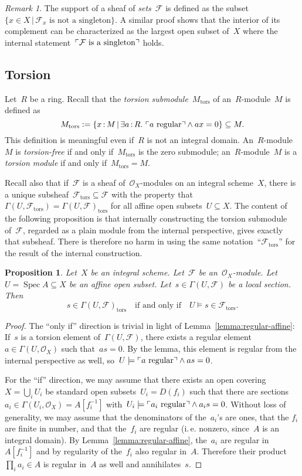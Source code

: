 \documentclass[10pt]{amsart}
\makeatletter
\theoremstyle{definition}
\theoremstyle{plain}
\newtheorem{prop}[defn]{Proposition}
\theoremstyle{remark}
\newtheorem{rem}[defn]{Remark}
\newcommand{\F}{\mathcal{F}}
\renewcommand{\O}{\mathcal{O}}
\newcommand{\tors}{\mathrm{tors}}
\DeclareMathOperator{\Spec}{Spec}
\newcommand{\?}{\,{:}\,}
\renewcommand{\_}{\mathpunct{.}\,}
\newcommand{\speak}[1]{\ulcorner\text{\textnormal{#1}}\urcorner}
\newcommand{\ie}{i.\,e.\@\xspace}
\newcommand{\defeq}{\vcentcolon=}
\makeatother
\begin{document}
\begin{rem}\label{rem:support-sheaf-of-sets}
The support of a sheaf of \emph{sets}~$\F$ is defined as the subset~$\{ x \in X \,|\,
\text{$\F_x$ is not a singleton} \}$. A similar proof shows that the interior
of its complement can be characterized as the largest open subset of~$X$ where
the internal statement~$\speak{$\F$ is a singleton}$ holds.\end{rem}


\subsection{Torsion} Let~$R$ be a ring. Recall that the
\emph{torsion submodule}~$M_\tors$ of an~$R$-module~$M$ is defined as
\[ M_\tors \defeq \{ x\?M \,|\, \exists a\?R\_ \speak{$a$ regular} \wedge ax = 0 \}
\subseteq M. \]
This definition is meaningful even if~$R$ is not an integral domain.
An~$R$-module~$M$ is \emph{torsion-free} if and only if~$M_\tors$ is
the zero submodule; an~$R$-module~$M$ is a \emph{torsion module} if and only
if~$M_\tors = M$.

Recall also that if~$\F$ is a sheaf of~$\O_X$-modules on an integral
scheme~$X$, there is a unique subsheaf~$\F_\tors \subseteq \F$ with the
property that~$\Gamma(U,\F_\tors) = \Gamma(U,\F)_\tors$ for all affine open
subsets~$U \subseteq X$. The content of the following proposition is that
internally constructing the torsion submodule of~$\F$, regarded as a plain
module from the internal perspective, gives exactly that subsheaf. There is
therefore no harm in using the same notation~``$\F_\tors$'' for the result of
the internal construction.

\begin{prop}Let~$X$ be an integral scheme. Let~$\F$ be an~$\O_X$-module. Let~$U
= \Spec A \subseteq X$ be an affine open subset. Let~$s \in \Gamma(U,\F)$ be a local
section. Then
\[ s \in \Gamma(U,\F)_\tors \quad\text{if and only if}\quad
  U \models s \in \F_\tors. \]
\end{prop}
\begin{proof}
The ``only if'' direction is trivial in light of
Lemma~\ref{lemma:regular-affine}: If~$s$ is a torsion element
of~$\Gamma(U,\F)$, there exists a regular element~$a \in \Gamma(U,\O_X)$ such
that~$as = 0$. By the lemma, this element is regular from the internal
perspective as well, so~$U \models \speak{$a$ regular} \wedge as = 0$.

For the ``if'' direction, we may assume that there exists an open covering~$X =
\bigcup_i U_i$ be standard open subsets~$U_i = D(f_i)$ such that there are
sections~$a_i \in \Gamma(U_i,\O_X) = A[f_i^{-1}]$ with~$U_i \models \speak{$a_i$ regular}
\wedge a_i s = 0$. Without loss of generality, we may assume that the
denominators of the~$a_i$'s are ones, that the $f_i$ are
finite in number, and that the~$f_i$ are regular (\ie nonzero, since~$A$ is an
integral domain). By Lemma~\ref{lemma:regular-affine}, the~$a_i$ are
regular in~$A[f_i^{-1}]$ and by regularity of the~$f_i$ also regular in~$A$.
Therefore their product~$\prod_i a_i \in A$ is regular in~$A$ as well and
annihilates~$s$.
\end{proof}
\end{document}
